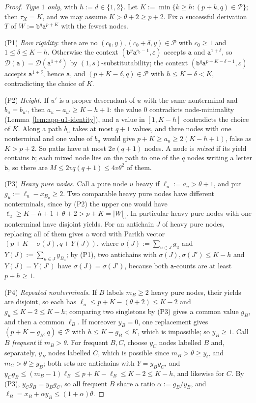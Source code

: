 \documentclass[11pt]{article}
\numberwithin{equation}{section}
\theoremstyle{plain}
\theoremstyle{definition}
\theoremstyle{remark}
\newcommand{\D}{\mathcal{D}}
\newcommand{\eps}{\varepsilon}
\begin{document}
\begin{proof}
\emph{Type $1$ only}, with $h:=d\in\{1,2\}$.  Let $K:=\min\{k\ge h:(p+k,q)\in\mathcal P\}$;
then $\tau_X=K$, and we may assume $K>\theta+2\ge p+2$.  Fix a successful derivation
$T$ of $W:=\mathtt b^q\mathtt a^{p+K}$ with the fewest nodes.

(P1) \emph{Row rigidity}: there are no $(c_0,y),(c_0+\delta,y)\in\mathcal P$ with
$c_0\ge1$ and $1\le\delta\le K-h$.  Otherwise the context
$(\mathtt b^y\mathtt a^{c_0-1},\eps)$ accepts $\mathtt a$ and $\mathtt a^{1+\delta}$, so
$\D(\mathtt a)=\D(\mathtt a^{1+\delta})$ by $(1,s)$-substitutability; the context
$(\mathtt b^q\mathtt a^{p+K-\delta-1},\eps)$ accepts $\mathtt a^{1+\delta}$, hence $\mathtt a$, and
$(p+K-\delta,q)\in\mathcal P$ with $h\le K-\delta<K$, contradicting the choice of $K$.

(P2) \emph{Height.}  If $u'$ is a proper descendant of $u$ with the same nonterminal
and $b_u=b_{u'}$, then $a_u-a_{u'}\ge K-h+1$: the value $0$ contradicts
node-minimality (Lemma~\ref{lem:app-u1-identity}), and a value in $[1,K-h]$
contradicts the choice of $K$.  Along a path $b_u$ takes at most $q+1$ values, and
three nodes with one nonterminal and one value of $b_u$ would give
$p+K\ge a_u\ge2(K-h+1)$, false as $K>p+2$.  So paths have at most $2v(q+1)$ nodes.
A node is \emph{mixed} if its yield contains $\mathtt b$; each mixed node lies on the
path to one of the $q$ nodes writing a letter $\mathtt b$, so there are
$M\le2vq(q+1)\le4v\theta^2$ of them.

(P3) \emph{Heavy pure nodes.}  Call a pure node $u$ heavy if $\ell_u:=a_u>\theta+1$,
and put $g_u:=\ell_u-x_{B_u}\ge2$.  Two comparable heavy pure nodes have different
nonterminals, since by (P2) the upper one would have
$\ell_u\ge K-h+1+\theta+2>p+K=|W|_{\mathtt a}$.  In particular heavy pure nodes with one
nonterminal have disjoint yields.  For an antichain $J$ of heavy pure nodes,
replacing all of them gives a word with Parikh vector
$(p+K-\sigma(J),q+Y(J))$, where $\sigma(J):=\sum_{u\in J}g_u$ and
$Y(J):=\sum_{u\in J}y_{B_u}$; by (P1), two antichains with
$\sigma(J),\sigma(J')\le K-h$ and $Y(J)=Y(J')$ have $\sigma(J)=\sigma(J')$, because
both $\mathtt a$-counts are at least $p+h\ge1$.

(P4) \emph{Repeated nonterminals.}  If $B$ labels $m_B\ge2$ heavy pure nodes, their
yields are disjoint, so each has $\ell_u\le p+K-(\theta+2)\le K-2$ and
$g_u\le K-2\le K-h$; comparing two singletons by (P3) gives a common value $g_B$, and
then a common $\ell_B$.  If moreover $y_B=0$, one replacement gives
$(p+K-g_B,q)\in\mathcal P$ with $h\le K-g_B<K$, which is impossible; so $y_B\ge1$.
Call $B$ \emph{frequent} if $m_B>\theta$.  For frequent $B,C$, choose $y_C$
nodes labelled $B$ and, separately, $y_B$ nodes labelled $C$, which is possible
since $m_B>\theta\ge y_C$ and $m_C>\theta\ge y_B$; both sets are antichains with
$Y=y_By_C$, and
$y_Cg_B\le(m_B-1)\ell_B\le p+K-\ell_B\le K-2\le K-h$, and likewise for $C$.  By (P3),
$y_Cg_B=y_Bg_C$, so all frequent $B$ share a ratio $\alpha:=g_B/y_B$, and
$\ell_B=x_B+\alpha y_B\le(1+\alpha)\theta$.


\end{proof}
\end{document}
